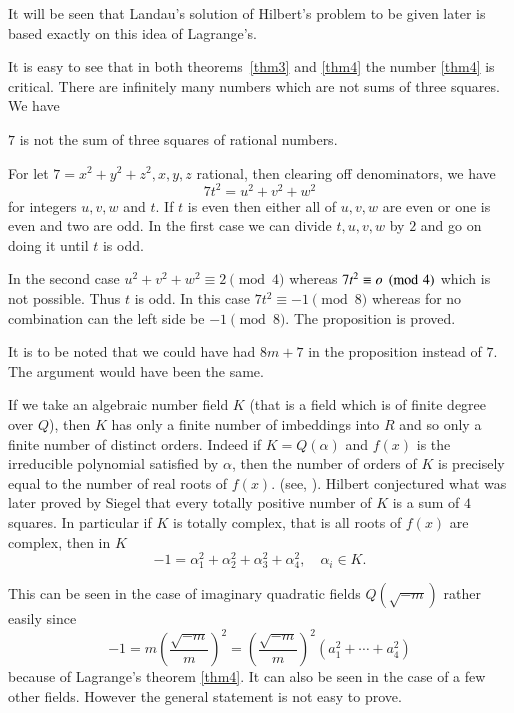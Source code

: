 It will be seen that Landau's solution of Hilbert's problem to be given
later is based exactly on this idea of Lagrange's.

It is easy to see that in both theorems~\ref{thm3} and \ref{thm4} the
number \ref{thm4} is critical. There are infinitely many numbers which
are not sums of three squares. We have 

\begin{prop}\label{prop3}
$7$ is not the sum of three squares of rational numbers.
\end{prop}

\begin{Proof}
For let $7=x^{2}+y^{2}+z^{2}, x, y, z$ rational, then clearing off
denominators, we have 
$$
7t^{2}=u^{2}+v^{2}+w^{2}
$$
for integers $u,v,w$ and $t$. If $t$ is even then either all of
$u,v,w$ are even or one is even and two are odd. In the first case we
can divide $t,u,v,w$ by $2$ and go on doing it until $t$ is odd.

In the second case $u^{2}+v^{2}+w^{2}\equiv 2\pmod 4$ whereas
$7t^{2}\equiv o \pmod 4$ which is not possible. Thus $t$ is odd. In
this case $7t^{2}\equiv -1 \pmod 8$ whereas for no combination can the
left side be $-1 \pmod 8$. The proposition is proved.

It is to be noted that we could have had $8m+7$ in the proposition
instead of $7$. The argument would have been the same. 

If we take an algebraic number field $K$ (that is a field which is of
finite degree over $Q$), then $K$ has only a finite number of
imbeddings into $R$ and so only a finite number of distinct
orders. Indeed if $K=Q(\alpha)$ and $f(x)$ is the irreducible
polynomial satisfied by $\alpha$, then the number of orders of $K$ is
precisely equal to the number of real roots of $f(x)$. (see,
\cite{key9}). Hilbert conjectured \cite{key7} what was later proved by
Siegel \cite{key16} that every totally positive number of $K$ is a sum
of $4$ squares. In particular if $K$ is totally complex, that is all
roots of $f(x)$ are complex, then in $K$
$$
-1=\alpha^{2}_1+\alpha^{2}_2+\alpha^{2}_3+\alpha^{2}_4,\quad \alpha_i
\in K.
$$

This can be seen in the case of imaginary quadratic fields
$Q(\sqrt{-m})$ rather easily since
$$
-1=m\left(\dfrac{\sqrt{-m}}{m}\right)^{2}=\left(\dfrac{\sqrt{-m}}{m}\right)^{2}\left(a^{2}_1+\cdots+a^{2}_4\right)
$$
because of Lagrange's theorem \ref{thm4}. It can also be seen in the
case of a few other fields. However the general statement is not easy
to prove.
\enprf
\end{Proof}


